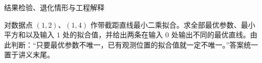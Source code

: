 \documentclass[aspectratio=169,10pt,fontset=fandol]{ctexbeamer}
\begin{document}
\begin{frame}[t,fragile]{结果检验、退化情形与工程解释}
\normalsize
{\normalsize
\begin{exercise}
\label{mathagent:exercise:2a86525c0362bd6004ffb20b570bb82a80598d07bb305d4bd130c7cd7cc87533}
对数据点 $(1,2)$、$(1,4)$ 作带截距直线最小二乘拟合。求全部最优参数、最小平方和以及输入 $1$ 处的拟合值，并给出两条在输入 $0$ 处输出不同的最优直线。由此判断：“只要最优参数不唯一，已有观测位置的拟合值就一定不唯一。”答案统一置于讲义末尾。
\end{exercise}
}
\end{frame}
\end{document}
